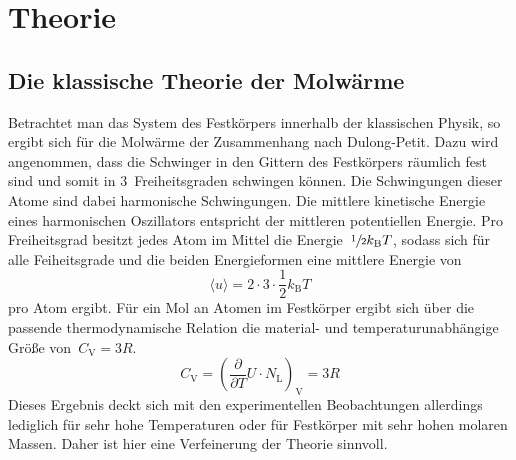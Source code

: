 \section{Theorie}
\label{sec:theorie}
%
\subsection{Die klassische Theorie der Molwärme}
%
Betrachtet man das System des Festkörpers innerhalb der klassischen Physik, so
ergibt sich für die Molwärme der Zusammenhang nach Dulong-Petit. Dazu wird
angenommen, dass die Schwinger in den Gittern des Festkörpers räumlich fest sind
und somit in \num{3}~Freiheitsgraden schwingen können. Die Schwingungen dieser
Atome sind dabei harmonische Schwingungen. Die mittlere kinetische Energie eines
harmonischen Oszillators entspricht der mittleren potentiellen Energie. Pro
Freiheitsgrad besitzt jedes Atom im Mittel die
Energie~$\sfrac{1}{2}k_{\mathrm{B}}T$, sodass sich für alle Feiheitsgrade und
die beiden Energieformen eine mittlere Energie von
%
\begin{equation}
  \langle u\rangle=2\cdot 3\cdot\frac{1}{2}k_{\mathrm{B}}T
\end{equation}
%
pro Atom ergibt. Für ein Mol an Atomen im Festkörper ergibt sich über die
passende thermodynamische Relation die material- und temperaturunabhängige Größe
von~$C_{\mathrm{V}}=3R$.
%
\begin{equation}
  C_{\mathrm{V}}=\left(\frac{\partial}{\partial T}U\cdot N_{\mathrm{L}}\right)_{\mathrm{V}}=3R
  \label{eq:CV}
\end{equation}
%
Dieses Ergebnis deckt sich mit den experimentellen Beobachtungen allerdings
lediglich für sehr hohe Temperaturen oder für Festkörper mit sehr hohen molaren
Massen. Daher ist hier eine Verfeinerung der Theorie sinnvoll.
%
